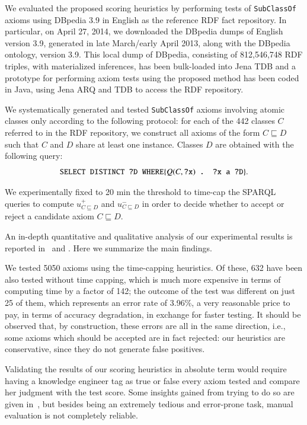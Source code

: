 \documentclass[review]{elsarticle}
\theoremstyle{definition}
\begin{document}
We evaluated the proposed scoring heuristics by performing tests of \texttt{SubClassOf}
axioms using DBpedia 3.9 in English as the reference RDF fact repository.
In particular, on April 27, 2014, we downloaded the DBpedia dumps of English version 3.9,
generated in late March/early April 2013, along with the DBpedia ontology, version 3.9.
This local dump of DBpedia, consisting of 812,546,748 RDF triples,
with materialized inferences,
has been bulk-loaded into Jena TDB and a prototype
for performing axiom tests using the proposed method has been coded in Java,
using Jena ARQ and TDB to access the RDF repository.

We systematically generated and tested \texttt{SubClassOf} axioms
involving atomic classes only according to the following protocol:
for each of the 442 classes $C$ referred to in the RDF repository,
we construct all axioms of the form $C \sqsubseteq D$ such that $C$ and $D$
share at least one instance. Classes $D$ are obtained with the following query: 
\[
  \mbox{\tt SELECT DISTINCT ?D WHERE} \{ Q(C, \mbox{\tt ?x}) \mbox{\tt\ . ?x a ?D} \}.
\]

We experimentally fixed to 20 min the threshold to time-cap the SPARQL queries to compute $u^+_{C \sqsubseteq D}$ and $u^-_{C \sqsubseteq D}$
in order to decide whether to accept or reject a candidate axiom $C \sqsubseteq D$.

An in-depth quantitative and qualitative analysis of our experimental results is reported in~\cite{TettamanziFaronZuckerGandon2014ekaw} and \cite{TettamanziFaronZuckerGandon2015kcap}. Here we summarize the main findings.

We tested 5050 axioms using the time-capping heuristics.
Of these, 632 have been also tested without time capping, which is much more
expensive in terms of computing time by a factor of 142;
the outcome of the test was different on just 25 of them, which
represents an error rate of 3.96\%, a very reasonable price to pay,
in terms of accuracy degradation, in exchange for faster testing.
It should be observed that, by construction, these errors are all in the same
direction, i.e., some axioms which should be accepted are in fact rejected:
our heuristics are conservative, since they do not generate false positives.

Validating the results of our scoring heuristics in absolute term would require
having a knowledge engineer tag as true or false every axiom tested and compare
her judgment with the test score. Some insights gained from trying to do so
are given in~\cite{TettamanziFaronZuckerGandon2015kcap},
but besides being an extremely tedious and error-prone task,
manual evaluation is not completely reliable.
\end{document}

